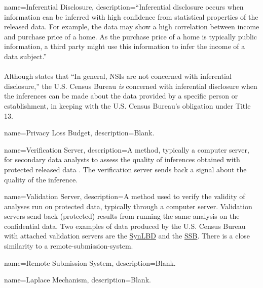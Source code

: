 {
    name=Inferential Disclosure,
    description={``Inferential disclosure occurs when information can
    be inferred with high confidence from statistical properties of
    the released data. For example, the data may show a high
    correlation between income and purchase price of a home. As the
    purchase price of a home is typically public information, a third
    party might use this information to infer the income of a data
    subject.''\parencite{oecd_oecd_nodate}\\
    ~\\
    Although \parencite{oecd_oecd_nodate} states that ``In general,
    NSIs are not concerned with inferential disclosure,'' the 
    U.S. Census Bureau \emph{is} concerned with inferential disclosure when
    the inferences can be made about the data provided by a specific
    person or establishment, in keeping with the U.S. Census Bureau's
    obligation under Title 13.
    }
}

{
    name=Privacy Loss Budget,
    description={Blank.
    }
}

{
    name=Verification Server,
    description={A method, typically a computer server,  for secondary data analysts to assess the quality of inferences obtained with protected released data \parencite{reiter_verification_2009,barrientos_providing_2018}. The verification server sends back a signal about the quality of the inference.
    } 
}

{
    name=Validation Server,
    description={A method used to verify the validity of analyses run on protected data, typically through a computer server. Validation servers send back  (protected) results from running the same analysis on the confidential data. Two examples of data produced by the U.S. Census Bureau with attached validation servers are the \href{https://www.census.gov/programs-surveys/ces/data/public-use-data/synthetic-longitudinal-business-database/validating-results.html}{SynLBD} and the \href{https://www.census.gov/programs-surveys/sipp/guidance/sipp-synthetic-beta-data-product.html}{SSB}. There is a close similarity to a \gls{remote-submission-system}.    } 
}

{
  name={Remote Submission System},
  description={Blank.}
}

{
    name=Laplace Mechanism,
    description={Blank.
    } 
}

